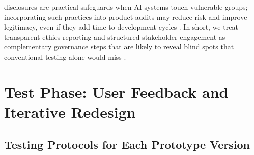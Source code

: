 \documentclass{article}
\begin{document}
disclosures are practical safeguards when AI systems touch vulnerable groups; incorporating such practices into product audits may reduce risk and improve legitimacy, even if they add time to development cycles \parencites[14]{4322181}. In short, we treat transparent ethics reporting and structured stakeholder engagement as complementary governance steps that are likely to reveal blind spots that conventional testing alone would miss \parencites[14]{4322181}.

\section{Test Phase: User Feedback and Iterative Redesign}

\subsection{Testing Protocols for Each Prototype Version}
\end{document}
